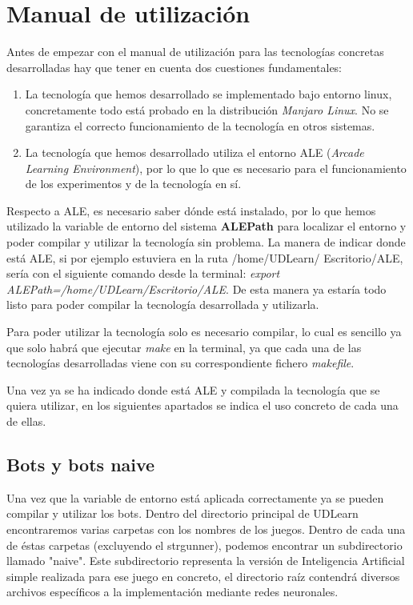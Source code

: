 \section{Manual de utilización}
\label{sec:usageManual}

Antes de empezar con el manual de utilización para las tecnologías concretas desarrolladas hay que tener en cuenta dos cuestiones fundamentales:

\begin{enumerate}
    \item La tecnología que hemos desarrollado se implementado bajo entorno linux, concretamente todo está probado en la distribución \textit{Manjaro Linux}. No se garantiza el correcto funcionamiento de la tecnología en otros sistemas.
    \item La tecnología que hemos desarrollado utiliza el entorno ALE (\textit{Arcade Learning Environment}), por lo que lo que es necesario para el funcionamiento de los experimentos y de la tecnología en sí.
\end{enumerate}

Respecto a ALE, es necesario saber dónde está instalado, por lo que hemos utilizado la variable de entorno del sistema \textbf{ALEPath} para localizar el entorno y poder compilar y utilizar la tecnología sin problema. La manera de indicar donde está ALE, si por ejemplo estuviera en la ruta /home/UDLearn/ Escritorio/ALE, sería con el siguiente comando desde la terminal: \textit{export ALEPath=/home/UDLearn/Escritorio/ALE}. De esta manera ya estaría todo listo para poder compilar la tecnología desarrollada y utilizarla.

Para poder utilizar la tecnología solo es necesario compilar, lo cual es sencillo ya que solo habrá que ejecutar \textit{make} en la terminal, ya que cada una de las tecnologías desarrolladas viene con su correspondiente fichero \textit{makefile}.

Una vez ya se ha indicado donde está ALE y compilada la tecnología que se quiera utilizar, en los siguientes apartados se indica el uso concreto de cada una de ellas.

\newpage
\subsection{Bots y bots naive}
Una vez que la variable de entorno está aplicada correctamente ya se pueden compilar y utilizar los bots. Dentro del directorio principal de UDLearn encontraremos varias carpetas con los nombres de los juegos. Dentro de cada una de éstas carpetas (excluyendo el strgunner), podemos encontrar un subdirectorio llamado "naive". Este subdirectorio representa la versión de Inteligencia Artificial simple realizada para ese juego en concreto, el directorio raíz contendrá diversos archivos específicos a la implementación mediante redes neuronales.

